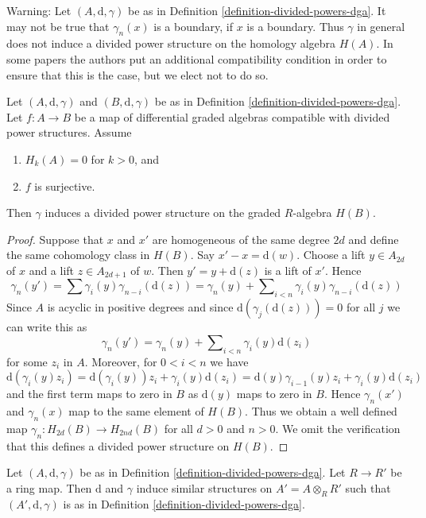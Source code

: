 \noindent
Warning: Let $(A, \text{d}, \gamma)$ be as in
Definition \ref{definition-divided-powers-dga}.
It may not be true that $\gamma_n(x)$ is a boundary, if
$x$ is a boundary. Thus $\gamma$ in general does not induce
a divided power structure on the homology algebra $H(A)$.
In some papers the authors put an additional compatibility
condition in order to ensure that this is the case, but we elect
not to do so.

\begin{lemma}
\label{lemma-dpdga-good}
Let $(A, \text{d}, \gamma)$ and $(B, \text{d}, \gamma)$ be as in
Definition \ref{definition-divided-powers-dga}. Let $f : A \to B$
be a map of differential graded algebras compatible with divided
power structures. Assume
\begin{enumerate}
\item $H_k(A) = 0$ for $k > 0$, and
\item $f$ is surjective.
\end{enumerate}
Then $\gamma$ induces a divided power structure on the graded
$R$-algebra $H(B)$.
\end{lemma}

\begin{proof}
Suppose that $x$ and $x'$ are homogeneous of the same degree $2d$
and define the same cohomology class in $H(B)$. Say $x' - x = \text{d}(w)$.
Choose a lift $y \in A_{2d}$ of $x$ and a lift $z \in A_{2d + 1}$
of $w$. Then $y' = y + \text{d}(z)$ is a lift of $x'$.
Hence
$$
\gamma_n(y') = \sum \gamma_i(y) \gamma_{n - i}(\text{d}(z))
= \gamma_n(y) +
\sum\nolimits_{i < n} \gamma_i(y) \gamma_{n - i}(\text{d}(z))
$$
Since $A$ is acyclic in positive degrees and since
$\text{d}(\gamma_j(\text{d}(z))) = 0$ for all $j$ we can write
this as
$$
\gamma_n(y') = \gamma_n(y) +
\sum\nolimits_{i < n} \gamma_i(y) \text{d}(z_i)
$$
for some $z_i$ in $A$. Moreover, for $0 < i < n$ we have
$$
\text{d}(\gamma_i(y) z_i) =
\text{d}(\gamma_i(y))z_i + \gamma_i(y)\text{d}(z_i) =
\text{d}(y) \gamma_{i - 1}(y) z_i + \gamma_i(y)\text{d}(z_i)
$$
and the first term maps to zero in $B$ as $\text{d}(y)$ maps to zero in $B$.
Hence $\gamma_n(x')$ and $\gamma_n(x)$ map to the same element of $H(B)$.
Thus we obtain a well defined map $\gamma_n : H_{2d}(B) \to H_{2nd}(B)$
for all $d > 0$ and $n > 0$. We omit the verification that this
defines a divided power structure on $H(B)$.
\end{proof}

\begin{lemma}
\label{lemma-base-change-div}
Let $(A, \text{d}, \gamma)$ be as in
Definition \ref{definition-divided-powers-dga}.
Let $R \to R'$ be a ring map.
Then $\text{d}$ and $\gamma$ induce similar structures on
$A' = A \otimes_R R'$ such that $(A', \text{d}, \gamma)$ is as in
Definition \ref{definition-divided-powers-dga}.
\end{lemma}

